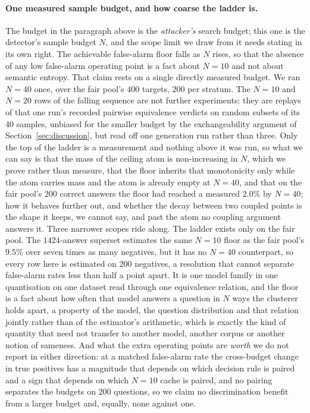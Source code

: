 \paragraph{One measured sample budget, and how coarse the ladder is.}
The budget in the paragraph above is the \emph{attacker's} search budget; this one is the
detector's sample budget $N$, and the scope limit we draw from it needs stating in its own
right. The achievable false-alarm floor falls as $N$ rises, so that the absence of any low
false-alarm operating point is a fact about $N{=}10$ and not about semantic entropy. That claim
rests on a single directly measured budget. We ran $N{=}40$ once, over the fair pool's $400$
targets, $200$ per stratum. The $N{=}10$ and $N{=}20$ rows of the falling sequence are not
further experiments: they are replays of that one run's recorded pairwise equivalence verdicts
on random subsets of its $40$ samples, unbiased for the smaller budget by the exchangeability
argument of Section~\ref{sec:discussion}, but read off one generation run rather than three.
Only the top of the ladder is a measurement and nothing above it was run, so what we can say is
that the mass of the ceiling atom is non-increasing in $N$, which we prove rather than measure,
that the floor inherits that monotonicity only while the atom carries mass and the atom is
already empty at $N{=}40$, and that on the fair pool's $200$ correct answers the floor had
reached a measured $2.0\%$ by $N{=}40$; how it behaves
further out, and whether the decay between two coupled points is the shape it keeps, we cannot
say, and past the atom no coupling argument answers it. Three narrower scopes ride along. The
ladder exists only on the fair pool. The
$1424$-answer superset estimates the same $N{=}10$ floor as the fair pool's $9.5\%$ over seven
times as many negatives, but it has no $N{=}40$ counterpart, so every row here is estimated on
$200$ negatives, a resolution that cannot separate false-alarm rates less than half a point
apart. It is one model family in one quantisation on one dataset read through one equivalence
relation, and the floor is a fact about how often that model answers a question in $N$ ways
the clusterer holds apart, a property of the model, the question distribution and that
relation jointly rather than of the estimator's arithmetic, which is exactly the kind of
quantity that need not transfer to another model, another corpus or another notion of
sameness. And what the extra
operating points are \emph{worth} we do not report in either direction: at a matched
false-alarm rate the cross-budget change in true positives has a magnitude that depends on
which decision rule is paired and a sign that depends on which $N{=}10$ cache is paired, and no
pairing separates the budgets on $200$ questions, so we claim no discrimination benefit from a
larger budget and, equally, none against one.

